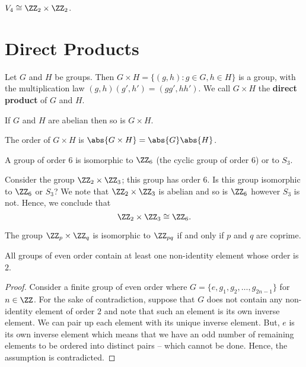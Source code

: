 \documentclass[12pt, a4paper]{article}
\begin{document}
\begin{proposition}
    \(V_4 \cong \ZZ_2 \times \ZZ_2\).
\end{proposition}

\pagebreak

\section{Direct Products}

\begin{definition}
    Let \(G\) and \(H\) be groups. Then \(G\times H = \{(g,h):g\in G,h\in H\}\) is a group, with the multiplication law \((g,h)(g',h') = (gg',hh')\). We call \(G\times H\) the \textbf{direct product} of \(G\) and \(H\).
\end{definition}

\begin{proposition}
    If \(G\) and \(H\) are abelian then so is \(G\times H\).
\end{proposition}

\begin{proposition}
    The order of \(G\times H\) is \(\abs{G\times H} =\abs{G}\abs{H}\).
\end{proposition}

\begin{mdthm}
    A group of order \(6\) is isomorphic to \(\ZZ_6\) (the cyclic group of order \(6\)) or to \(S_3\).
\end{mdthm}

\begin{example}
    Consider the group \(\ZZ_2\times \ZZ_3\); this group has order \(6\). Is this group isomorphic to \(\ZZ_6\) or \(S_3\)? We note that \(\ZZ_2\times \ZZ_3\) is abelian and so is \(\ZZ_6\) however \(S_3\) is not. Hence, we conclude that 
    \[\ZZ_2\times \ZZ_3 \cong \ZZ_6.\]
\end{example}

\begin{mdthm}
    The group \(\ZZ_p \times \ZZ_q\) is isomorphic to \(\ZZ_{pq}\) if and only if \(p\) and \(q\) are coprime.
\end{mdthm}

\begin{lemma}
    All groups of even order contain at least one non-identity element whose order is \(2\).
\end{lemma}

\begin{proof}
    Consider a finite group of even order where \(G = \{e,g_1,g_2,\ldots, g_{2n-1}\}\) for \(n \in \ZZ\). For the sake of contradiction, suppose that \(G\) does not contain any non-identity element of order \(2\) and note that such an element is its own inverse element. We can pair up each element with its unique inverse element. But, \(e\) is its own inverse element which means that we have an odd number of remaining elements to be ordered into distinct pairs -- which cannot be done. Hence, the assumption is contradicted.
\end{proof}
\end{document}
